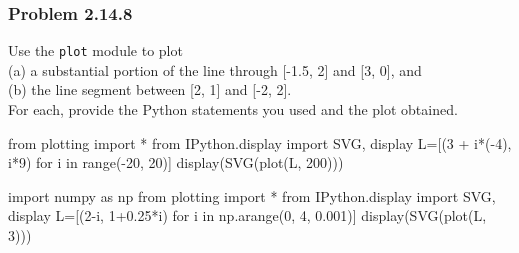 \documentclass[
  letterpaper,
  DIV=11,
  numbers=noendperiod]{scrartcl}
\newenvironment{Shaded}{\begin{snugshade}}{\end{snugshade}}
\newcommand{\BuiltInTok}[1]{\textcolor[rgb]{0.00,0.23,0.31}{#1}}
\newcommand{\ControlFlowTok}[1]{\textcolor[rgb]{0.00,0.23,0.31}{#1}}
\newcommand{\DecValTok}[1]{\textcolor[rgb]{0.68,0.00,0.00}{#1}}
\newcommand{\FloatTok}[1]{\textcolor[rgb]{0.68,0.00,0.00}{#1}}
\newcommand{\ImportTok}[1]{\textcolor[rgb]{0.00,0.46,0.62}{#1}}
\newcommand{\KeywordTok}[1]{\textcolor[rgb]{0.00,0.23,0.31}{#1}}
\newcommand{\NormalTok}[1]{\textcolor[rgb]{0.00,0.23,0.31}{#1}}
\newcommand{\OperatorTok}[1]{\textcolor[rgb]{0.37,0.37,0.37}{#1}}
\begin{document}
\hypertarget{problem-2.14.8}{%
\subsubsection{Problem 2.14.8}\label{problem-2.14.8}}

Use the \texttt{plot} module to plot\\
(a) a substantial portion of the line through {[}-1.5, 2{]} and {[}3,
0{]}, and\\
(b) the line segment between {[}2, 1{]} and {[}-2, 2{]}.\\
For each, provide the Python statements you used and the plot obtained.

\begin{Shaded}
\begin{Highlighting}[numbers=left,,]
\ImportTok{from}\NormalTok{ plotting }\ImportTok{import} \OperatorTok{*}
\ImportTok{from}\NormalTok{ IPython.display }\ImportTok{import}\NormalTok{ SVG, display}
\NormalTok{L}\OperatorTok{=}\NormalTok{[(}\DecValTok{3} \OperatorTok{+}\NormalTok{ i}\OperatorTok{*}\NormalTok{(}\OperatorTok{{-}}\DecValTok{4}\NormalTok{), i}\OperatorTok{*}\DecValTok{9}\NormalTok{) }\ControlFlowTok{for}\NormalTok{ i }\KeywordTok{in} \BuiltInTok{range}\NormalTok{(}\OperatorTok{{-}}\DecValTok{20}\NormalTok{, }\DecValTok{20}\NormalTok{)]}
\NormalTok{display(SVG(plot(L, }\DecValTok{200}\NormalTok{)))}
\end{Highlighting}
\end{Shaded}

\begin{figure}[H]

{\centering 

}

\end{figure}

\begin{Shaded}
\begin{Highlighting}[numbers=left,,]
\ImportTok{import}\NormalTok{ numpy }\ImportTok{as}\NormalTok{ np}
\ImportTok{from}\NormalTok{ plotting }\ImportTok{import} \OperatorTok{*}
\ImportTok{from}\NormalTok{ IPython.display }\ImportTok{import}\NormalTok{ SVG, display}
\NormalTok{L}\OperatorTok{=}\NormalTok{[(}\DecValTok{2}\OperatorTok{{-}}\NormalTok{i, }\DecValTok{1}\OperatorTok{+}\FloatTok{0.25}\OperatorTok{*}\NormalTok{i) }\ControlFlowTok{for}\NormalTok{ i }\KeywordTok{in}\NormalTok{ np.arange(}\DecValTok{0}\NormalTok{, }\DecValTok{4}\NormalTok{, }\FloatTok{0.001}\NormalTok{)]}
\NormalTok{display(SVG(plot(L, }\DecValTok{3}\NormalTok{)))}
\end{Highlighting}
\end{Shaded}
\end{document}
